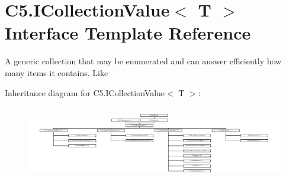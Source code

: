 \hypertarget{interface_c5_1_1_i_collection_value}{}\section{C5.\+I\+Collection\+Value$<$ T $>$ Interface Template Reference}
\label{interface_c5_1_1_i_collection_value}


A generic collection that may be enumerated and can answer efficiently how many items it contains. Like  


Inheritance diagram for C5.\+I\+Collection\+Value$<$ T $>$\+:\begin{figure}[H]
\begin{center}
\leavevmode
\includegraphics[height=3.268482cm]{interface_c5_1_1_i_collection_value}
\end{center}
\end{figure}
